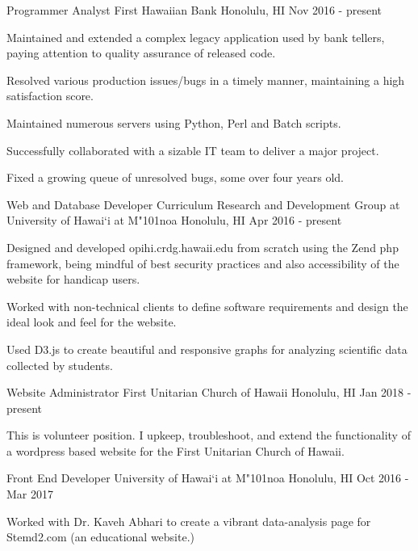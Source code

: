 \begin{cventries}
   	\cventry
    {Programmer Analyst}
    {First Hawaiian Bank}
    {Honolulu, HI}
    {Nov 2016 - present}
    {
        \begin{cvitems}
            \item {Maintained and extended a complex legacy application used by bank tellers, paying attention to quality assurance of released code.}
            \item {Resolved various production issues/bugs in a timely manner, maintaining a high satisfaction score.}
            \item {Maintained numerous servers using Python, Perl and Batch scripts.}
            \item {Successfully collaborated with a sizable IT team to deliver a major project.}
            \item {Fixed a growing queue of unresolved bugs, some over four years old.}
        \end{cvitems}
    }
	\cventry
	{Web and Database Developer}
	{Curriculum Research and Development Group at University of Hawai`i at M{\char"101}noa}
	{Honolulu, HI}
	{Apr 2016 - present}
	{
		\begin{cvitems}
			\item {Designed and developed opihi.crdg.hawaii.edu from scratch using the Zend php framework, being mindful of best security practices and also accessibility of the website for handicap users.}
			\item {Worked with non-technical clients to define software requirements and design the ideal look and feel for the website.}
			\item {Used D3.js to create beautiful and responsive graphs for analyzing scientific data collected by students.}
		\end{cvitems}
	}
	\cventry
	{Website Administrator}
	{First Unitarian Church of Hawaii}
	{Honolulu, HI}
	{Jan 2018 - present}
	{
	\begin{cvitems}
		\item {This is volunteer position. I upkeep, troubleshoot, and extend the functionality of a wordpress based website for the First Unitarian Church of Hawaii.}
	\end{cvitems}
	}
	\cventry
	{Front End Developer}
	{University of Hawai`i at M{\char"101}noa}
	{Honolulu, HI}
	{Oct 2016 - Mar 2017}
	{
		\begin{cvitems}
			\item {Worked with Dr. Kaveh Abhari to create a vibrant data-analysis page for Stemd2.com (an educational website.)}

\end{cvitems}}
\end{cventries}
